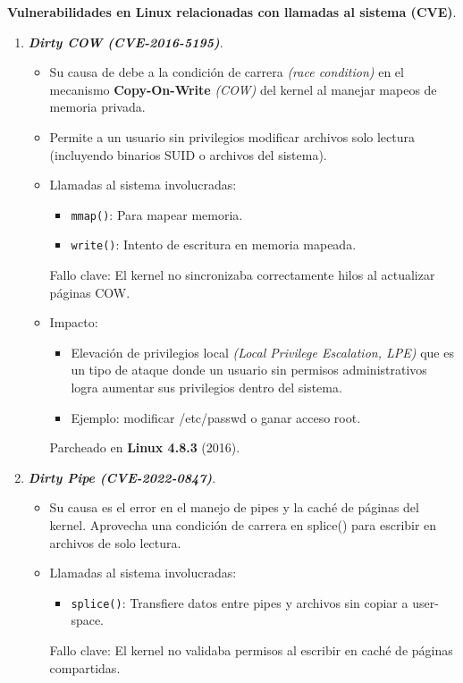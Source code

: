 \documentclass[12pt,letterpaper]{article}
\begin{document}
\begin{enumerate}
  \textbf{Vulnerabilidades en Linux relacionadas con llamadas al sistema (CVE)}.
  
  \begin{enumerate}[label=\arabic*)]
  \item \textbf{\textit{Dirty COW (CVE-2016-5195)}}.
    \begin{itemize}
    \item Su causa de debe a la condición de carrera \textit{(race condition)} en el mecanismo \textbf{Copy-On-Write} \textit{(COW)} del kernel al manejar mapeos de memoria privada.
      
    \item Permite a un usuario sin privilegios modificar archivos solo lectura (incluyendo binarios SUID o archivos del sistema).
      
    \item Llamadas al sistema involucradas:
      \begin{itemize}
        \item \texttt{mmap()}: Para mapear memoria.
        \item \texttt{write()}: Intento de escritura en memoria mapeada.
      \end{itemize}
      Fallo clave: El kernel no sincronizaba correctamente hilos al actualizar páginas COW.
      
    \item Impacto:
      \begin{itemize}
        \item Elevación de privilegios local \textit{(Local Privilege Escalation, LPE)} que es un tipo de ataque donde un usuario sin permisos administrativos logra aumentar sus privilegios dentro del sistema.
        \item Ejemplo: modificar /etc/passwd o ganar acceso root.
      \end{itemize}
      Parcheado en \textbf{Linux 4.8.3} (2016).
    \end{itemize}

    
  \item \textbf{\textit{Dirty Pipe (CVE-2022-0847)}}.
    \begin{itemize}
    \item Su causa es el error en el manejo de pipes y la caché de páginas del kernel. Aprovecha una condición de carrera en splice() para escribir en archivos de solo lectura.

    \item Llamadas al sistema involucradas:
      \begin{itemize}
      \item \texttt{splice()}: Transfiere datos entre pipes y archivos sin copiar a user-space.
      \end{itemize}
      Fallo clave: El kernel no validaba permisos al escribir en caché de páginas compartidas.
      

\end{itemize}
\end{enumerate}
\end{enumerate}
\end{document}
